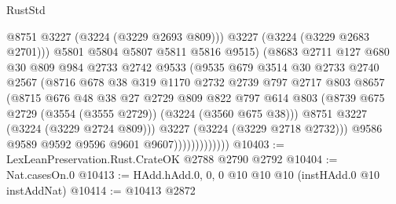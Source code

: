 \begin{lexlean}{RustStd}
\begin{coremodule}
                                @8751
                                @3227
                                (@3224 (@3229 @2693 @809)))
                              @3227
                              (@3224 (@3229 @2683 @2701)))
                            @5801
                            @5804
                            @5807
                            @5811
                            @5816
                            @9515)
                          (@8683
                            @2711
                            @127
                            @680
                            @30
                            @809
                            @984
                            @2733
                            @2742
                            @9533
                            (@9535
                              @679
                              @3514
                              @30
                              @2733
                              @2740
                              @2567
                              (@8716
                                @678
                                @38
                                @319
                                @1170
                                @2732
                                @2739
                                @797
                                @2717
                                @803
                                @8657
                                (@8715
                                  @676
                                  @48
                                  @38
                                  @27
                                  @2729
                                  @809
                                  @822
                                  @797
                                  @614
                                  @803
                                  (@8739 @675 @2729 (@3554 (@3555 @2729)) (@3224 (@3560 @675 @38)))
                                  @8751
                                  @3227
                                  (@3224 (@3229 @2724 @809)))
                                @3227
                                (@3224 (@3229 @2718 @2732)))
                              @9586
                              @9589
                              @9592
                              @9596
                              @9601
                              @9607)))))))))))))
@10403 := LexLeanPreservation.Rust.CrateOK @2788 @2790 @2792
@10404 := Nat.casesOn.{0}
@10413 := HAdd.hAdd.{0, 0, 0} @10 @10 @10 (instHAdd.{0} @10 instAddNat)
@10414 := @10413 @2872

\end{coremodule}
\end{lexlean}
